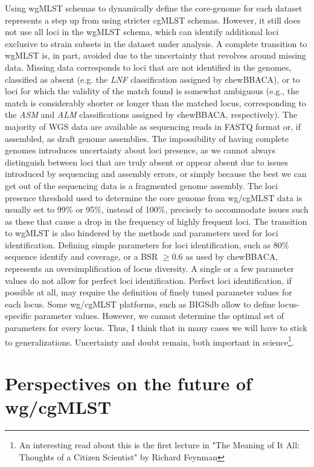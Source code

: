 Using wgMLST schemas to dynamically define the core-genome for each dataset represents a step up from using stricter cgMLST schemas. However, it still does not use all loci in the wgMLST schema, which can identify additional loci exclusive to strain subsets in the dataset under analysis. A complete transition to wgMLST is, in part, avoided due to the uncertainty that revolves around missing data. Missing data corresponds to loci that are not identified in the genomes, classified as absent (e.g. the \textit{LNF} classification assigned by chewBBACA), or to loci for which the validity of the match found is somewhat ambiguous (e.g., the match is considerably shorter or longer than the matched locus, corresponding to the \textit{ASM} and \textit{ALM} classifications assigned by chewBBACA, respectively). The majority of WGS data are available as sequencing reads in FASTQ format or, if assembled, as draft genome assemblies. The impossibility of having complete genomes introduces uncertainty about loci presence, as we cannot always distinguish between loci that are truly absent or appear absent due to issues introduced by sequencing and assembly errors, or simply because the best we can get out of the sequencing data is a fragmented genome assembly. The loci presence threshold used to determine the core genome from \ac{wg/cgMLST} data is usually set to 99\% or 95\%, instead of 100\%, precisely to accommodate issues such as these that cause a drop in the frequency of highly frequent loci.
The transition to wgMLST is also hindered by the methods and parameters used for loci identification. Defining simple parameters for loci identification, such as 80\% sequence identify and coverage, or a BSR $\geq0.6$ as used by chewBBACA, represents an oversimplification of locus diversity. A single or a few parameter values do not allow for perfect loci identification. Perfect loci identification, if possible at all, may require the definition of finely tuned parameter values for each locus. Some wg/cgMLST platforms, such as BIGSdb allow to define locus-specific parameter values. However, we cannot determine the optimal set of parameters for every locus. Thus, I think that in many cases we will have to stick to generalizations. Uncertainty and doubt remain, both important in science\footnote{An interesting read about this is the first lecture in "The Meaning of It All: Thoughts of a Citizen Scientist" by Richard Feynman}.

\section{Perspectives on the future of wg/cgMLST}

